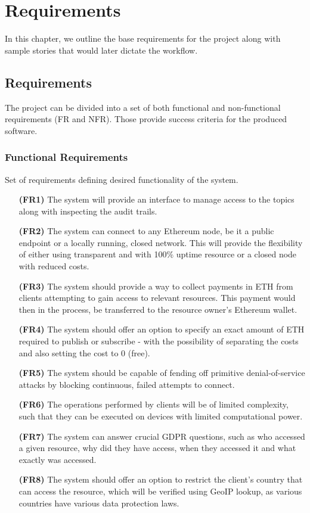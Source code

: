 \chapter{Requirements}
In this chapter, we outline the base requirements for the project along with sample stories that would later dictate the workflow.

\section{Requirements}

The project can be divided into a set of both functional and non-functional requirements (FR and NFR). Those provide success criteria for the  produced software.

\subsection{Functional Requirements}\label{sec:func}
Set of requirements defining desired functionality of the system.

\begin{itemize}[leftmargin=4.5em]
\item[\textbf{(FR1)}] The system will provide an interface to manage access to the topics along with inspecting the audit trails.
\item[\textbf{(FR2)}] The system can connect to any Ethereum node, be it a public endpoint or a locally running, closed network. This will provide the flexibility of either using transparent and with 100\% uptime resource or a closed node with reduced costs.
\item[\textbf{(FR3)}] The system should provide a way to collect payments in ETH from clients attempting to gain access to relevant resources. This payment would then in the process, be transferred to the resource owner's Ethereum wallet.
\item[\textbf{(FR4)}] The system should offer an option to specify an exact amount of ETH required to publish or subscribe - with the possibility of separating the costs and also setting the cost to 0 (free).
\item[\textbf{(FR5)}] The system should be capable of fending off primitive denial-of-service attacks by blocking continuous, failed attempts to connect.
\item[\textbf{(FR6)}] The operations performed by clients will be of limited complexity, such that they can be executed on devices with limited computational power.
\item[\textbf{(FR7)}] The system can answer crucial GDPR questions, such as who accessed a given resource, why did they have access, when they accessed it and what exactly was accessed.
\item[\textbf{(FR8)}] The system should offer an option to restrict the client's country that can access the resource, which will be verified using GeoIP lookup, as various countries have various data protection laws.
\end{itemize}

